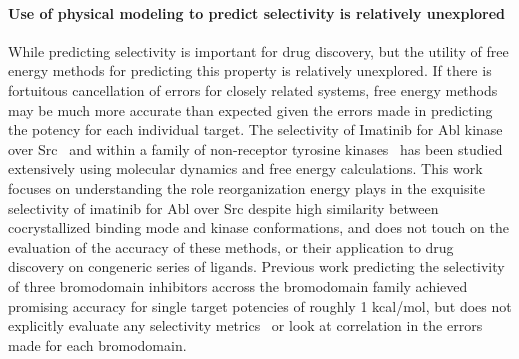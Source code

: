 \documentclass[9pt,lineno]{elife-modified} %
\begin{document}
\paragraph{Use of physical modeling to predict selectivity is relatively unexplored}
While predicting selectivity is important for drug discovery, but the utility of free energy methods for predicting this property is relatively unexplored. If there is fortuitous cancellation of errors for closely related systems, free energy methods may be much more accurate than expected given the errors made in predicting the potency for each individual target. The selectivity of Imatinib for Abl kinase over Src~\citep{Lin2013-ft,Lin2014-iv} and within a family of non-receptor tyrosine kinases~\citep{Lin2013-mu} has been studied extensively using molecular dynamics and free energy calculations. This work focuses on understanding the role reorganization energy plays in the exquisite selectivity of imatinib for Abl over Src despite high similarity between cocrystallized binding mode and kinase conformations, and does not touch on the evaluation of the accuracy of these methods, or their application to drug discovery on congeneric series of ligands. Previous work predicting the selectivity of three bromodomain inhibitors accross the bromodomain family achieved promising accuracy for single target potencies of roughly 1 kcal/mol, but does not explicitly evaluate any selectivity metrics~\citep{Aldeghi2017-ox} or look at correlation in the errors made for each bromodomain. 
\end{document}
